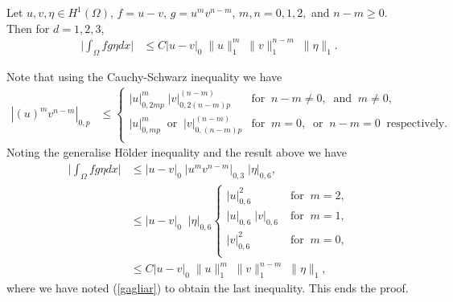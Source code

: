 \begin{Lem}\label{Lem201}
Let $u,v,\eta \in H^1{(\Omega)}$, $f=u-v$, $g=u^m v^{n-m}$, $m,n=0,1,2,$ and $n-m\geq
0$. Then for $d=1,2,3,$
\begin{align}
\bigg| \int_\Omega f g \eta dx \bigg| &\leq C |u-v|_0\; \|u\|_1^m\; \|v\|_1^{n-m}\; \|\eta\|_1.
\label{2le000}
\end{align}
\end{Lem}
\bproof
Note that using the Cauchy-Schwarz inequality we have
\begin{align*}
|(u)^m v^{n-m}|_{0,p}&\leq
\begin{cases}
|u|_{0,2mp}^m \;|v|_{0,2(n-m)p}^{(n-m)}&\mbox{for}\;\;
 n-m\neq 0,\;\;\mbox{and}\;\; m\neq 0,\\
|u|_{0,mp}^m \;\;\mbox{or}\;\;|v|_{0,(n-m)p}^{(n-m)}&\mbox{for}\;\;
 m= 0,\;\;\mbox{or}\;\; n-m= 0\;\;\mbox{respectively}.\\
\end{cases}
\end{align*}
Noting the  generalise H\"older inequality  and the result above we have
\begin{align*}
\bigg| \int_\Omega f g \eta dx \bigg| 
&\leq |u-v|_0\;|u^m v^{n-m}|_{0,3}\;|\eta|_{0,6},\\
&\leq |u-v|_0\;\;|\eta|_{0,6}
\begin{cases}
|u|_{0,6}^2\;&\mbox{for}\;\;m=2,\\
|u|_{0,6}\;|v|_{0,6} \;&\mbox{for}\;\;m=1,\\
|v|_{0,6}^2 \;&\mbox{for}\;\;m=0,\\
\end{cases}\\
&\leq C |u-v|_0\; \|u\|_1^m\; \|v\|_1^{n-m}\; \|\eta\|_1,
\end{align*}
where we have noted (\ref{gagliar}) to obtain the last inequality.
This ends the proof.\eproof

\setcounter{equation}{0}
